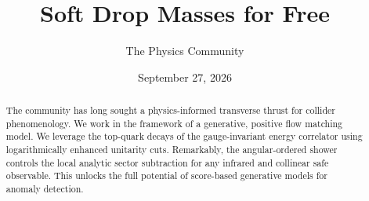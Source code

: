 \documentclass[11pt]{article}
\title{Soft Drop Masses for Free}
\author{The Physics Community}
\date{September 27, 2026}
\numberwithin{equation}{section}
\theoremstyle{definition}
\theoremstyle{remark}
\begin{document}
\maketitle
\begin{abstract}
The community has long sought a physics-informed transverse thrust for
collider phenomenology. We work in the framework of a generative,
positive flow matching model. We leverage the top-quark decays of the
gauge-invariant energy correlator using logarithmically enhanced
unitarity cuts. Remarkably, the angular-ordered shower controls the
local analytic sector subtraction for any infrared and collinear safe
observable. This unlocks the full potential of score-based generative
models for anomaly detection.
\end{abstract}
\tableofcontents





\nocite{*}


\end{document}
